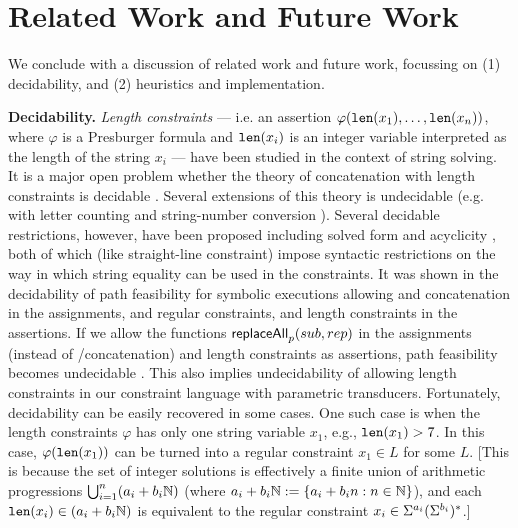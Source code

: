 
\vspace{-2mm}

\section{Related Work and Future Work}
\label{sec:related}
\vspace{-2mm}


We conclude with a discussion of related work and future work, focussing on
(1) decidability, and (2) heuristics and implementation.

\smallskip
\noindent
\textbf{Decidability.}
\emph{Length constraints} --- i.e. an assertion 
$\varphi(\texttt{len}(x_1),\ldots,\texttt{len}(x_n))$, where $\varphi$ is a Presburger formula
and $\texttt{len}(x_i)$ is an integer variable interpreted as the length of the string
$x_i$ --- have been studied in the context of string solving. It is
a major open problem whether the theory of concatenation with length
constraints is decidable \cite{Vijay-length}. Several extensions of this 
theory is undecidable (e.g. with letter counting \cite{buchi} and
string-number conversion \cite{GB16}).
Several decidable restrictions, however,
have been proposed including solved form \cite{Vijay-length} and acyclicity 
\cite{Abdulla14}, both of which (like straight-line constraint) impose 
syntactic restrictions on the way in which string equality can be
used in the constraints. It was shown in \cite{LB16} the decidability of path 
feasibility for symbolic
executions allowing \FT{} and concatenation in the 
assignments, and regular constraints, and length constraints 
in the assertions. If we allow the functions
$\mathsf{replaceAll}_p(sub,rep)$ in the assignments (instead of
\FT{}/concatenation) and length constraints as assertions, path
feasibility becomes undecidable \cite{CCHLW18}. This also implies undecidability
of allowing length constraints in our constraint language with parametric
transducers. Fortunately, decidability can be easily recovered in some
cases. One such case is when the length constraints $\varphi$ has only
one string variable $x_1$, e.g., $\texttt{len}(x_1) > 7$. In this case,
$\varphi(\texttt{len}(x_1))$ can be turned into a regular constraint $x_1 \in L$ for
some $L$. [This is because the set of integer solutions is effectively
a finite union of arithmetic progressions $\bigcup_{i=1}^n (a_i + b_i\mathbb{N})$
(where $a_i + b_i\mathbb{N} := \{ a_i + b_in : n \in \mathbb{N}\}$), and each 
$\texttt{len}(x_i) \in (a_i + b_i\mathbb{N})$ is equivalent to the regular constraint 
$x_i \in \Sigma^{a_i} (\Sigma^{b_i})^*$.] 

